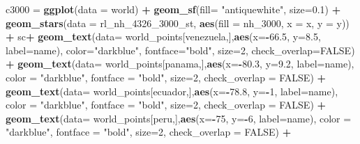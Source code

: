 \documentclass[12pt,oneside]{reedthesis}
\newenvironment{Shaded}{\begin{snugshade}}{\end{snugshade}}
\newcommand{\DataTypeTok}[1]{\textcolor[rgb]{0.13,0.29,0.53}{#1}}
\newcommand{\DecValTok}[1]{\textcolor[rgb]{0.00,0.00,0.81}{#1}}
\newcommand{\FloatTok}[1]{\textcolor[rgb]{0.00,0.00,0.81}{#1}}
\newcommand{\KeywordTok}[1]{\textcolor[rgb]{0.13,0.29,0.53}{\textbf{#1}}}
\newcommand{\NormalTok}[1]{#1}
\newcommand{\OperatorTok}[1]{\textcolor[rgb]{0.81,0.36,0.00}{\textbf{#1}}}
\newcommand{\OtherTok}[1]{\textcolor[rgb]{0.56,0.35,0.01}{#1}}
\newcommand{\StringTok}[1]{\textcolor[rgb]{0.31,0.60,0.02}{#1}}
\begin{document}
\begin{Shaded}
\begin{Highlighting}[]
\NormalTok{c3000 =}\StringTok{ }\KeywordTok{ggplot}\NormalTok{(}\DataTypeTok{data =}\NormalTok{ world) }\OperatorTok{+}\StringTok{ }
\StringTok{  }\KeywordTok{geom_sf}\NormalTok{(}\DataTypeTok{fill=} \StringTok{"antiquewhite"}\NormalTok{, }\DataTypeTok{size=}\FloatTok{0.1}\NormalTok{) }\OperatorTok{+}\StringTok{ }
\StringTok{  }\KeywordTok{geom_stars}\NormalTok{(}\DataTypeTok{data =}\NormalTok{ rl_nh_}\DecValTok{4326}\NormalTok{_}\DecValTok{3000}\NormalTok{_st, }\KeywordTok{aes}\NormalTok{(}\DataTypeTok{fill =}\NormalTok{ nh_}\DecValTok{3000}\NormalTok{, }\DataTypeTok{x =}\NormalTok{ x, }\DataTypeTok{y =}\NormalTok{ y)) }\OperatorTok{+}\StringTok{ }
\StringTok{  }\NormalTok{sc}\OperatorTok{+}
\StringTok{  }\KeywordTok{geom_text}\NormalTok{(}\DataTypeTok{data=}\NormalTok{ world_points[venezuela,],}\KeywordTok{aes}\NormalTok{(}\DataTypeTok{x=}\OperatorTok{-}\FloatTok{66.5}\NormalTok{, }\DataTypeTok{y=}\FloatTok{8.5}\NormalTok{, }\DataTypeTok{label=}\NormalTok{name), }\DataTypeTok{color=}\StringTok{"darkblue"}\NormalTok{, }\DataTypeTok{fontface=}\StringTok{"bold"}\NormalTok{, }\DataTypeTok{size=}\DecValTok{2}\NormalTok{, }\DataTypeTok{check_overlap=}\OtherTok{FALSE}\NormalTok{) }\OperatorTok{+}
\StringTok{  }\KeywordTok{geom_text}\NormalTok{(}\DataTypeTok{data=}\NormalTok{ world_points[panama,],}\KeywordTok{aes}\NormalTok{(}\DataTypeTok{x=}\OperatorTok{-}\FloatTok{80.3}\NormalTok{, }\DataTypeTok{y=}\FloatTok{9.2}\NormalTok{, }\DataTypeTok{label=}\NormalTok{name), }\DataTypeTok{color =} \StringTok{"darkblue"}\NormalTok{, }\DataTypeTok{fontface =} \StringTok{"bold"}\NormalTok{, }\DataTypeTok{size=}\DecValTok{2}\NormalTok{, }\DataTypeTok{check_overlap =} \OtherTok{FALSE}\NormalTok{) }\OperatorTok{+}\StringTok{ }
\StringTok{  }\KeywordTok{geom_text}\NormalTok{(}\DataTypeTok{data=}\NormalTok{ world_points[ecuador,],}\KeywordTok{aes}\NormalTok{(}\DataTypeTok{x=}\OperatorTok{-}\FloatTok{78.8}\NormalTok{, }\DataTypeTok{y=}\OperatorTok{-}\DecValTok{1}\NormalTok{, }\DataTypeTok{label=}\NormalTok{name), }\DataTypeTok{color =} \StringTok{"darkblue"}\NormalTok{, }\DataTypeTok{fontface =} \StringTok{"bold"}\NormalTok{, }\DataTypeTok{size=}\DecValTok{2}\NormalTok{, }\DataTypeTok{check_overlap =} \OtherTok{FALSE}\NormalTok{) }\OperatorTok{+}
\StringTok{  }\KeywordTok{geom_text}\NormalTok{(}\DataTypeTok{data=}\NormalTok{ world_points[peru,],}\KeywordTok{aes}\NormalTok{(}\DataTypeTok{x=}\OperatorTok{-}\DecValTok{75}\NormalTok{, }\DataTypeTok{y=}\OperatorTok{-}\DecValTok{6}\NormalTok{, }\DataTypeTok{label=}\NormalTok{name), }\DataTypeTok{color =} \StringTok{"darkblue"}\NormalTok{, }\DataTypeTok{fontface =} \StringTok{"bold"}\NormalTok{, }\DataTypeTok{size=}\DecValTok{2}\NormalTok{, }\DataTypeTok{check_overlap =} \OtherTok{FALSE}\NormalTok{) }\OperatorTok{+}

\end{Highlighting}
\end{Shaded}
\end{document}
